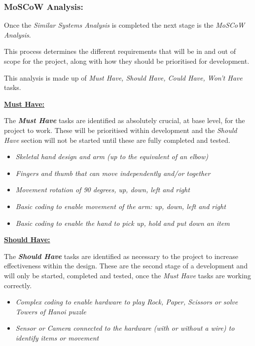 \documentclass[progress]{cmpreport}
\begin{document}
\subsubsection{MoSCoW Analysis:}
Once the \textit{Similar Systems Analysis} is completed the next stage is the \textit{MoSCoW Analysis}.

This process determines the different requirements that will be in and out of scope for the project, along with how they should be prioritised for development. 

This analysis is made up of \textit{Must Have, Should Have, Could Have, Won't Have} tasks. \newline

\textbf{\underline{Must Have:}} 

The \textbf{\textit{Must Have}} tasks are identified as absolutely crucial, at base level, for the project to work. These will be prioritised within development and the \textit{Should Have} section will not be started until these are fully completed and tested. 

\begin{itemize}
	\item \textit{Skeletal hand design and arm (up to the equivalent of an elbow)}
	\item \textit{Fingers and thumb that can move independently and/or together}
	\item \textit{Movement rotation of 90 degrees, up, down, left and right}
	\item \textit{Basic coding to enable movement of the arm: up, down, left and right}
	\item \textit{Basic coding to enable the hand to pick up, hold and put down an item}  \newline
\end{itemize} 

\textbf{\underline{Should Have:}} 

The \textbf{\textit{Should Have}} tasks are identified as necessary to the project to increase effectiveness within the design. These are the second stage of a development and will only be started, completed and tested, once the \textit{Must Have} tasks are working correctly.

\begin{itemize}	
	\item \textit{Complex coding to enable hardware to play Rock, Paper, Scissors or solve Towers of Hanoi puzzle}
	\item \textit{Sensor or Camera connected to the hardware (with or without a wire) to identify items or movement} \newline
\end{itemize}	
\end{document}
